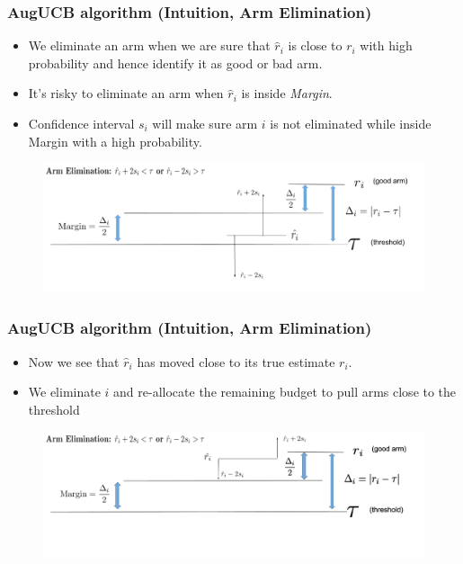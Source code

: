 \begin{frame}
\frametitle{AugUCB algorithm (Intuition, Arm Elimination)}
\begin{itemize}
\item We eliminate an arm when we are sure that $\hat{r}_i$ is close to $r_i$ with high probability and hence identify it as good or bad arm.
\item It's risky to eliminate an arm when $\hat{r}_i$ is inside \emph{Margin}. 
\item Confidence interval $s_i$ will make sure arm $i$ is not eliminated while inside Margin with a high probability.  
\end{itemize}

\begin{figure}
\includegraphics[scale=0.278]{img/ArmElim_1.png}
\end{figure}
\end{frame}

\begin{frame}
\frametitle{AugUCB algorithm (Intuition, Arm Elimination)}

\begin{itemize}
\item Now we see that $\hat{r}_i$ has moved close to its true estimate $r_i$.
\item We eliminate $i$ and re-allocate the remaining budget to pull arms close to the threshold
\end{itemize}


\begin{figure}
\includegraphics[scale=0.278]{img/ArmElim2.png}
\end{figure}
\end{frame}

